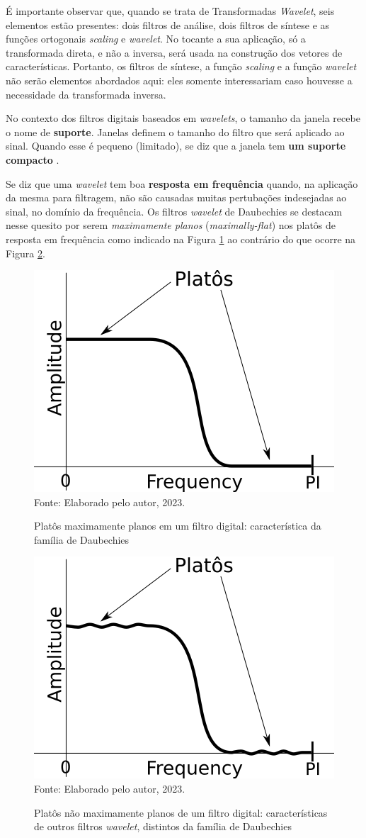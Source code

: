 \documentclass[a4paper,12pt,openright,oneside]{book}
\newenvironment{myenv}[1]
  {\begin{spacing}{#1}}
  {\end{spacing}}
\begin{document}
\begin{myenv}{1.5}
						\par É importante observar que, quando se trata de Transformadas \textit{Wavelet}, seis elementos estão presentes: dois filtros de análise, dois filtros de síntese e as funções ortogonais \textit{scaling} e \textit{wavelet}. No tocante a sua aplicação, só a transformada direta, e não a inversa, será usada na construção dos vetores de características. Portanto, os filtros de síntese, a função \textit{scaling} e a função \textit{wavelet} não serão elementos abordados aqui: eles somente interessariam caso houvesse a necessidade da transformada inversa.
						
						\par No contexto dos filtros digitais baseados em \textit{wavelets}, o tamanho da janela recebe o nome de \textbf{suporte}. Janelas definem o tamanho do filtro que será aplicado ao sinal. Quando esse é pequeno (limitado), se diz que a janela tem \textbf{um suporte compacto} \cite{robi2003}.
						
						\par Se diz que uma \textit{wavelet} tem boa \textbf{resposta em frequência} quando, na aplicação da mesma para filtragem, não são causadas muitas pertubações indesejadas ao sinal, no domínio da frequência. Os filtros \textit{wavelet} de Daubechies \cite{daubechies1992ten} se destacam nesse quesito por serem \textit{maximamente planos} (\textit{maximally-flat}) \cite{butterworth1930} \cite{bianchi2007electronic} nos platôs de resposta em frequência como indicado na Figura \ref{fig:daubechies} ao contrário do que ocorre na Figura \ref{fig:nomaximallyflat}.
						
						\begin{figure}[h]
							\centering
							\caption{Platôs maximamente planos em um filtro digital: característica da família de Daubechies}
							\includegraphics[width=0.3\linewidth]{images/daubechies}
							\label{fig:daubechies}
							\\Fonte: Elaborado pelo autor, 2023.
						\end{figure}
						
						\begin{figure}[h]
							\centering
							\caption{Platôs não maximamente planos de um filtro digital: características de outros filtros \textit{wavelet}, distintos da família de Daubechies}
							\includegraphics[width=0.3\linewidth]{images/noMaximallyFlat}
							\label{fig:nomaximallyflat}
							\\Fonte: Elaborado pelo autor, 2023.
						\end{figure}
						

\end{myenv}
\end{document}
